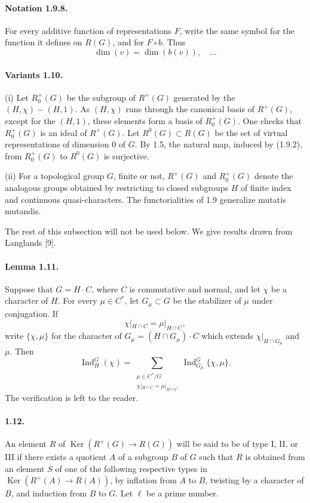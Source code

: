 \documentclass[10pt]{article}
\newcommand{\Ind}{\operatorname{Ind}}
\providecommand{\Ker}{\operatorname{Ker}}
\providecommand{\Ind}{\operatorname{Ind}}
\providecommand{\Ker}{\operatorname{Ker}}
\begin{document}
\paragraph{Notation 1.9.8.} For every additive function of representations \(F\), write the same symbol for the function it defines on \(R(G)\), and for \(F\circ b\). Thus
\[
\dim(v)=\dim(b(v)),\quad\ldots
\]

\paragraph{Variants 1.10.} (i) Let \(R^+_0(G)\) be the subgroup of \(R^+(G)\) generated by the \((H,\chi)-(H,1)\). As \((H,\chi)\) runs through the canonical basis of \(R^+(G)\), except for the \((H,1)\), these elements form a basis of \(R^+_0(G)\). One checks that \(R^+_0(G)\) is an ideal of \(R^+(G)\). Let \(R^0(G)\subset R(G)\) be the set of virtual representations of dimension \(0\) of \(G\). By 1.5, the natural map, induced by (1.9.2), from \(R^+_0(G)\) to \(R^0(G)\) is surjective.

(ii) For a topological group \(G\), finite or not, \(R^+(G)\) and \(R^+_0(G)\) denote the analogous groups obtained by restricting to closed subgroups \(H\) of finite index and continuous quasi-characters. The functorialities of 1.9 generalize mutatis mutandis.

The rest of this subsection will not be used below. We give results drawn from Langlands [9].

\paragraph{Lemma 1.11.} Suppose that \(G=H\cdot C\), where \(C\) is commutative and normal, and let \(\chi\) be a character of \(H\). For every \(\mu\in C^*\), let \(G_\mu\subset G\) be the stabilizer of \(\mu\) under conjugation. If
\[
\chi|_{H\cap C}=\mu|_{H\cap C},
\]
write \(\{\chi,\mu\}\) for the character of \(G_\mu=(H\cap G_\mu)\cdot C\) which extends \(\chi|_{H\cap G_\mu}\) and \(\mu\). Then
\[
\Ind_H^G(\chi)=
\sum_{\substack{\mu\in C^*/G\\ \chi|_{H\cap C}=\mu|_{H\cap C}}}
\Ind_{G_\mu}^G\{\chi,\mu\}.
\]
The verification is left to the reader.

\paragraph{1.12.} An element \(R\) of \(\Ker(R^+(G)\to R(G))\) will be said to be of type I, II, or III if there exists a quotient \(A\) of a subgroup \(B\) of \(G\) such that \(R\) is obtained from an element \(S\) of one of the following respective types in \(\Ker(R^+(A)\to R(A))\), by inflation from \(A\) to \(B\), twisting by a character of \(B\), and induction from \(B\) to \(G\). Let \(\ell\) be a prime number.
\end{document}
